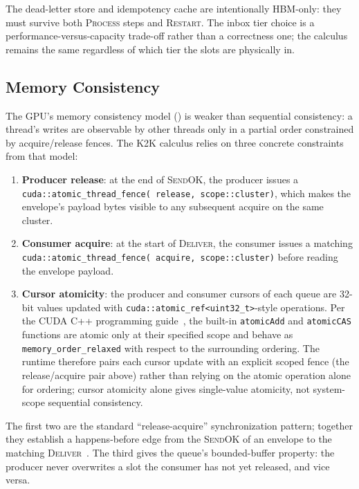 The dead-letter store and idempotency cache are intentionally HBM-only:
they must survive both \textsc{Process} steps and \textsc{Restart}.
The inbox tier choice is a performance-versus-capacity trade-off
rather than a correctness one; the calculus remains the same
regardless of which tier the slots are physically in.

\subsection{Memory Consistency}
\label{sec:memory:consistency}

The GPU's memory consistency model
(\citet{lustig2014abstraction,hower2014}) is weaker than sequential
consistency: a thread's writes are observable by other threads only
in a partial order constrained by acquire/release fences.  The K2K
calculus relies on three concrete constraints from that model:

\begin{enumerate}
\item \textbf{Producer release}: at the end of \textsc{SendOK},
the producer issues a
\texttt{cuda::\allowbreak atomic\_thread\_fence(\allowbreak
release,\ scope::cluster)}, which makes the envelope's payload
bytes visible to any subsequent acquire on the same cluster.

\item \textbf{Consumer acquire}: at the start of \textsc{Deliver},
the consumer issues a matching
\texttt{cuda::\allowbreak atomic\_thread\_fence(\allowbreak
acquire,\ scope::cluster)} before reading the envelope payload.

\item \textbf{Cursor atomicity}: the producer and consumer cursors
of each queue are 32-bit values updated with
\texttt{cuda::atomic\_ref<uint32\_t>}-style operations.  Per the
CUDA C++ programming
guide~\citep{nvidia2023cooperative,nvidia2023hopperguide}, the
built-in \texttt{atomicAdd} and \texttt{atomicCAS} functions are
atomic only at their specified scope and behave as
\texttt{memory\_order\_relaxed} with respect to the surrounding
ordering.  The runtime therefore pairs each cursor update with an
explicit scoped fence (the release/acquire pair above) rather than
relying on the atomic operation alone for ordering; cursor atomicity
alone gives single-value atomicity, not system-scope sequential
consistency.
\end{enumerate}

The first two are the standard ``release-acquire'' synchronization
pattern; together they establish a happens-before edge from the
\textsc{SendOK} of an envelope to the matching
\textsc{Deliver}~\citep{lustig2014abstraction}.  The third gives the
queue's bounded-buffer property: the producer never overwrites a
slot the consumer has not yet released, and vice versa.

